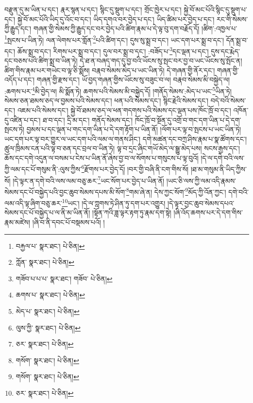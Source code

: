 བརྫུན་དུ་མ་ཡིན་པ་དང་། རྣར་སྙན་པ་དང་། སྙིང་དུ་སྡུག་པ་དང་། གྲོང་ཁྱེར་པ་དང་། སྐྱེ་བོ་མང་པོའི་སྙིང་དུ་སྡུག་པ་དང་། སྐྱེ་བོ་མང་པོའི་ཡིད་དུ་འོང་བ་དང་། ཡིད་དགའ་བར་བྱེད་པ་དང་། ཡིད་ཚིམ་པར་བྱེད་པ་དང་། རང་གི་སེམས་ཀྱི་རྒྱུད་དང་། གཞན་གྱི་སེམས་ཀྱི་རྒྱུད་དང་བར་བྱེད་པའི་ཚིག་རྣམ་པ་དེ་ལྟ་བུ་དག་བརྗོད་དོ། །ཚིག་:འཁྱལ་པ་\footnote{བརྐྱལ་པ་  སྣར་ཐང་།  པེ་ཅིན། }སྤངས་པ་ཡིན་ཏེ། ལན་ལེགས་པར་གློན་\footnote{ཀློན་  སྣར་ཐང་།  པེ་ཅིན། }པའི་ཚིག་དང་། དུས་སུ་སྨྲ་བ་དང་། ཡང་དག་པར་སྨྲ་བ་དང་། དོན་སྨྲ་བ་དང་། ཆོས་སྨྲ་བ་དང་། རིགས་པར་སྨྲ་བ་དང་། དུལ་བར་སྨྲ་བ་དང་། :བཟོད་པ་\footnote{གཟོབ་པ་པ་པ་  སྣར་ཐང་། གཟོབ་  པེ་ཅིན། }དང་ལྡན་པ་དང་། དུས་དང་རྨེད་དང་བཅས་པའི་ཚིག་སྨྲ་བ་ཡིན་ཏེ། དེ་ཐ་ན་བཞད་གད་དུ་བྱ་བའི་ཡོངས་སུ་སྤང་བར་བྱ་བ་ཡང་ཡོངས་སུ་སྤོང་ན། ཚིག་གིས་རྣམ་པར་གཡེང་བ་ལྟ་ཅི་སྨོས། བརྣབ་སེམས་མེད་པ་ཡང་ཡིན་ཏེ། དེ་གཞན་གྱི་ནོར་དང་། གཞན་གྱི་འདོད་པ་དང་། གཞན་གྱི་རྫས་དང་། ཡོ་བྱད་གཞན་གྱིས་ཡོངས་སུ་བཟུང་བ་ལ། བརྣབ་སེམས་མི་བསྐྱེད་ལ། :ཆགས་པར་\footnote{ཆགས་པ་  སྣར་ཐང་།  པེ་ཅིན། }མི་བྱེད་ལ། མི་སྨོན་ཏེ། ཆགས་པའི་སེམས་མི་བསྐྱེད་དོ། །གནོད་སེམས་:མེད་པ་ཡང་\footnote{མེད་པ་  སྣར་ཐང་།  པེ་ཅིན། }ཡིན་ཏེ། སེམས་ཅན་ཐམས་ཅད་ལ་བྱམས་པའི་སེམས་དང་། ཕན་པའི་སེམས་དང་། སྙིང་རྗེའི་སེམས་དང་། བདེ་བའི་སེམས་དང་། འཇམ་པའི་སེམས་དང་། སྐྱེ་བོ་ཐམས་ཅད་ལ་ཕན་གདགས་པའི་སེམས་དང་ལྡན་པས་ཁོང་ཁྲོ་བ་དང་། འཁོན་དུ་འཛིན་པ་དང་། ཐ་བ་དང་། དྲི་མ་དང་། གནོད་སེམས་དང་། ཁོང་ཁྲོ་བ་སྔོན་དུ་འགྲོ་བ་གང་དག་ཡིན་པ་དེ་དག་སྤངས་ཏེ། བྱམས་པ་དང་ལྡན་པ་གང་དག་ཡིན་པ་དེ་དག་རྟོག་པ་ཡིན་ནོ། །ལོག་པར་ལྟ་བ་སྤངས་པ་ཡང་ཡིན་ཏེ། ཡང་དག་པར་ལྟ་བར་གྱུར་ལ་ཡང་དག་པའི་ལམ་ལ་གནས་ཤིང་། དགེ་མཚན་དང་བཀྲ་ཤིས་རྣམ་པ་སྣ་ཚོགས་དང་། ཚུལ་ཁྲིམས་ངན་པའི་ལྟ་བ་ཅན་དང་བྲལ་བ་ཡིན་ཏེ། ལྟ་བ་དྲང་ཞིང་གཡོ་མེད་ལ་སྒྱུ་མེད་པས། སངས་རྒྱས་དང་། ཆོས་དང་དགེ་འདུན་ལ་བསམ་པ་ངེས་པ་ཡིན་ནོ་ཞེས་བྱ་བ་ལ་སོགས་པ་གསུངས་པ་ལྟ་བུའོ། །དེ་ལ་དགེ་བའི་ལས་ཀྱི་ལམ་དང་པོ་གསུམ་ནི་:ལུས་ཀྱིས་\footnote{ལུས་ཀྱི་  སྣར་ཐང་།  པེ་ཅིན། }རྫོགས་པར་བྱེད་དོ། །བར་གྱི་བཞི་ནི་ངག་གིས་སོ། །ཐ་མ་གསུམ་ནི་ཡིད་ཀྱིས་སོ། །དེ་ལྟར་ན་དགེ་བའི་ལས་ལམ་བཅུ་ཆར་\footnote{ཅར་  སྣར་ཐང་།  པེ་ཅིན། }ཡང་སོག་པར་བྱེད་པ་ཡིན་ནོ། །ཡང་ཅི་ལས་ཀྱི་ལམ་འདི་རྣམས་སེམས་དང་པོ་བསྐྱེད་པའི་བྱང་ཆུབ་སེམས་དཔས་མི་སོག་\footnote{གསོག་  སྣར་ཐང་།  པེ་ཅིན། }གམ་ཞེ་ན། དེས་ཀྱང་སོག་\footnote{གསོག་  སྣར་ཐང་།  པེ་ཅིན། }མོད་ཀྱི་འོན་ཀྱང་། དགེ་བའི་ལམ་འདི་ལྟ་ཞིག་བཅུ་ཆར་\footnote{ཅར་  སྣར་ཐང་།  པེ་ཅིན། }ཡང་། །དེ་ལ་ཀླགས་ཏེ་ཤིན་ཏུ་དག་པར་འགྱུར། །དེ་ལྟར་བྱང་ཆུབ་སེམས་དཔའ་སེམས་དང་པོ་བསྐྱེད་པ་ལ་ནི་མ་ཡིན་ནོ། །སྟོན་ཀའི་ཟླ་ལྟར་རྟག་ཏུ་རྣམ་དག་སྟེ། །ཞི་འོད་ཆགས་པར་དེ་དག་གིས་རྣམ་མཛེས། །ཞི་བ་ནི་དབང་པོ་བསྡམས་པའོ། །

